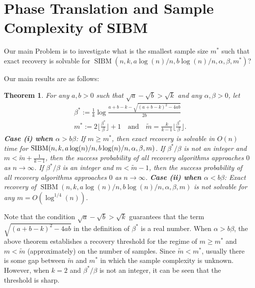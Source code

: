 \documentclass[conference]{IEEEtran}
\newtheorem{theorem}{Theorem}%
\DeclareMathOperator{\SIBM}{SIBM}
\begin{document}
\section{Phase Translation and Sample Complexity of SIBM}\label{s:trans}
Our main Problem is to investigate what is the smallest sample size $m^\ast$ such that exact recovery is solvable for $\SIBM(n,k, a\log(n)/n, b\log(n)/n,\alpha,\beta,m^\ast)$?

Our main results are as follows:

\begin{theorem} \label{thm:wt1}
For any $a,b> 0$ such that $\sqrt{a}-\sqrt{b}> \sqrt{k}$ and any $\alpha,\beta>0$, let
\begin{align} \label{eq:defstar}
&\beta^\ast := \frac{1}{k}
\log\frac{a+b-k-\sqrt{(a+b-k)^2-4ab}}{2 b}  \\
&m^\ast := 2 \Big\lfloor \frac{\beta^\ast}{\beta} \Big\rfloor +1 \text{~~~and~~~}
\tilde{m} = \frac{k}{k-1}\Big\lfloor \frac{\beta^\ast}{\beta} \Big\rfloor .
\end{align}
{\bf Case (i) when $\alpha>b\beta$}: If $m\ge m^\ast$, then exact recovery is solvable in $O(n)$ time for $\SIBM(n,k, a\log(n)/n, \linebreak[4] b\log(n)/n,\alpha,\beta,m)$.
If $\beta^\ast/\beta$ is not an integer and $m < \tilde{m} + \frac{1}{k-1}$, then the success probability of all recovery algorithms approaches $0$ as $n\to\infty$.
If $\beta^\ast/\beta$ is an integer and $m < \tilde{m} -1$, then the success probability of all recovery algorithms approaches $0$ as $n\to\infty$.
{\bf Case (ii) when $\alpha<b\beta$}: Exact recovery of $\SIBM(n,k, a\log(n)/n, b\log(n)/n,\alpha,\beta,m)$ is not solvable for any $m=O(\log^{1/4}(n))$.
\end{theorem}
Note that the condition $\sqrt{a}-\sqrt{b} > \sqrt{k}$ guarantees that the term $\sqrt{(a+b-k)^2-4ab}$ in the definition of $\beta^\ast$ is a real number.
When $\alpha > b \beta$,
the above theorem establishes a recovery threshold
for the regime of $m \geq m^\ast$ and $m < \tilde{m}$ (approximately) on the number of samples. Since $\tilde{m} < m^*$,
usually there is some gap between $\tilde{m}$ and $m^\ast$ in which the sample complexity is unknown.
However, when $k=2$ and $\beta^\ast/\beta$ is not an integer, it can be seen that the threshold is sharp.
\end{document}

